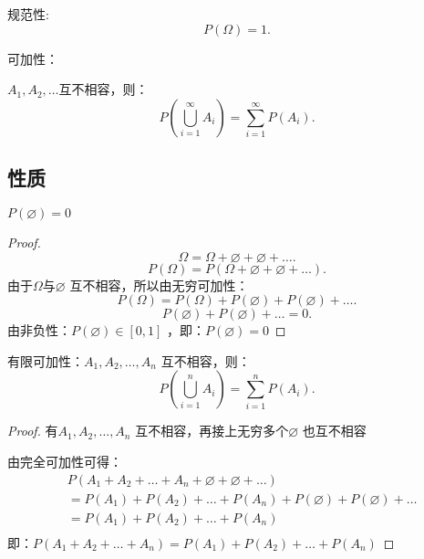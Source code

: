 \begin{axiom}
    规范性:
    \[
        P\left( \Omega \right) =1
    .\]
\end{axiom}

\begin{axiom}
    可加性：

    $A_1,A_2,\ldots$互不相容，则：
    \[
        P\left( \bigcup_{i=1}^{\infty}A_i \right) =\sum_{i=1}^{\infty} P\left( A_i \right)
    .\] 
\end{axiom}

\subsection{性质}%
\label{sub:性质}
\begin{rrule}
    $P\left( \varnothing \right) =0$
\end{rrule}
\begin{proof}
    \[
        \Omega=\Omega+\varnothing+\varnothing+\ldots
    .\] 
    \[
        P\left( \Omega \right) =P\left( \Omega+\varnothing+\varnothing+\ldots \right) 
    .\] 
    由于$\Omega$与$\varnothing$ 互不相容，所以由无穷可加性：
    \[
        P\left( \Omega \right) =P\left( \Omega \right) +P\left( \varnothing \right) +P\left( \varnothing \right) +\ldots
    .\] 
    \[
        P\left( \varnothing \right) +P\left( \varnothing \right) +\ldots=0
    .\] 
    由非负性：$P\left( \varnothing \right) \in \left[ 0,1 \right] $ ，即：$P\left( \varnothing \right) =0$
\end{proof}

\begin{rrule}
    有限可加性：$A_1,A_2,\ldots,A_n$ 互不相容，则：\[
        P\left( \bigcup_{i=1}^{n}A_i \right) =\sum_{i=1}^{n} P\left( A_i \right) 
    .\] 
\end{rrule}
\begin{proof}
    有$A_1,A_2,\ldots,A_n$ 互不相容，再接上无穷多个$\varnothing$ 也互不相容

    由完全可加性可得：
    \begin{equation}
        \begin{aligned}
            &P\left( A_1+A_2+\ldots+A_n+\varnothing+\varnothing+\ldots \right)\\
            &= P\left( A_1 \right) +P\left( A_2 \right) +\ldots+P\left( A_n \right) +P\left( \varnothing \right) +P\left( \varnothing \right) +\ldots\\
            &= P\left( A_1 \right) +P\left( A_2 \right) +\ldots+P\left( A_n \right) \\
        \end{aligned}
    \end{equation}
    即：$P\left( A_1+A_2+\ldots+A_n \right)=P\left( A_1 \right) +P\left( A_2 \right) +\ldots+P\left( A_n \right) $
\end{proof}

